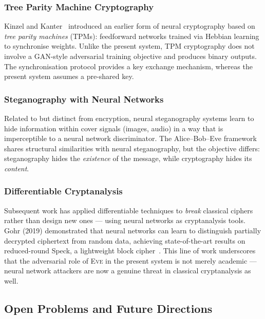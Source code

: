 \documentclass[12pt, a4paper]{article}
\newcommand{\eve}{\textsc{Eve}}
\begin{document}
\subsubsection*{Tree Parity Machine Cryptography}

Kinzel and Kanter~\cite{kinzel2002neural} introduced an earlier form
of neural cryptography based on \emph{tree parity machines} (TPMs):
feedforward networks trained via Hebbian learning to synchronise weights.
Unlike the present system, TPM cryptography does not involve a GAN-style
adversarial training objective and produces binary outputs. The
synchronisation protocol provides a key exchange mechanism, whereas
the present system assumes a pre-shared key.

\subsubsection*{Steganography with Neural Networks}

Related to but distinct from encryption, neural steganography systems
learn to hide information within cover signals (images, audio) in a
way that is imperceptible to a neural network discriminator. The
Alice--Bob--Eve framework shares structural similarities with
neural steganography, but the objective differs: steganography hides
the \emph{existence} of the message, while cryptography hides its
\emph{content}.

\subsubsection*{Differentiable Cryptanalysis}

Subsequent work has applied differentiable techniques to
\emph{break} classical ciphers rather than design new ones ---
using neural networks as cryptanalysis tools. Gohr (2019)
demonstrated that neural networks can learn to distinguish
partially decrypted ciphertext from random data, achieving
state-of-the-art results on reduced-round Speck, a lightweight
block cipher~\cite{gohr2019improving}.
This line of work underscores that the adversarial role of \eve{}
in the present system is not merely academic --- neural network
attackers are now a genuine threat in classical cryptanalysis as well.

\subsection{Open Problems and Future Directions}
\label{subsec:future}
\end{document}
